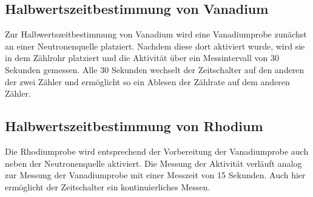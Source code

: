 \documentclass[titlepage = firstcover]{scrartcl}
\begin{document}
        \subsection{Halbwertszeitbestimmung von Vanadium}
            Zur Halbwertszeitbestimmung von Vanadium wird eine Vanadiumprobe zunächst an einer Neutronenquelle platziert. Nachdem diese dort aktiviert wurde, wird sie in dem Zählrohr platziert und 
            die Aktivität über ein Messintervall von 30 Sekunden gemessen. Alle 30 Sekunden wechselt der Zeitschalter auf den anderen der zwei Zähler und ermöglicht so ein Ablesen der Zählrate auf
            dem anderen Zähler.

        \subsection{Halbwertszeitbestimmung von Rhodium}
            Die Rhodiumprobe wird entsprechend der Vorbereitung der Vanadiumprobe auch neben der Neutronenquelle aktiviert. Die Messung der Aktivität verläuft analog zur Messung der Vanadiumprobe
            mit einer Messzeit von 15 Sekunden. Auch hier ermöglicht der Zeitschalter ein kontinuierliches Messen.
            
        
                
        
\end{document}
